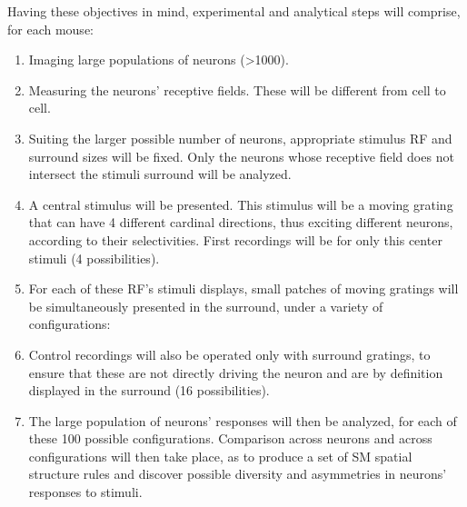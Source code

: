 Having these objectives in mind, experimental and analytical steps will comprise, for each mouse: 
\begin{enumerate}
    \item Imaging large populations of neurons (>1000).
    \item Measuring the neurons' receptive fields. These will be different from cell to cell. 
    \item Suiting the larger possible number of neurons, appropriate stimulus RF and surround sizes will be fixed. Only the neurons whose receptive field does not intersect the stimuli surround will be analyzed.
    \item A central stimulus will be presented. This stimulus will be a moving grating that can have 4 different cardinal directions, thus exciting different neurons, according to their selectivities. First recordings will be for only this center stimuli (4 possibilities).
    
    \item For each of these RF's stimuli displays, small patches of moving gratings will be simultaneously presented in the surround, under a variety of configurations:
    
        
    
    \item Control recordings will also be operated only with surround gratings, to ensure that these are not directly driving the neuron and are by definition displayed in the surround (16 possibilities).
        
    \item The large population of neurons' responses will then be analyzed, for each of these 100 possible configurations. Comparison across neurons and across configurations will then take place, as to produce a set of SM spatial structure rules and discover possible diversity and asymmetries in neurons' responses to stimuli. 
    

\end{enumerate}